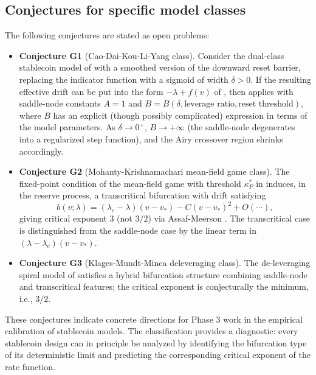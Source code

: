 \documentclass[11pt,a4paper]{article}
\theoremstyle{plain}
\theoremstyle{definition}
\begin{document}
\subsection{Conjectures for specific model classes}

The following conjectures are stated as open problems:

\begin{itemize}
\item \textbf{Conjecture G1} (Cao-Dai-Kou-Li-Yang class). Consider the dual-class stablecoin model of \cite{CaoDaiKouLiYang2025} with a smoothed version of the downward reset barrier, replacing the indicator function with a sigmoid of width $\delta > 0$. If the resulting effective drift can be put into the form $-\lambda + f(v)$ of , then  applies with saddle-node constants $A = 1$ and $B = B(\delta, \text{leverage ratio}, \text{reset threshold})$, where $B$ has an explicit (though possibly complicated) expression in terms of the model parameters. As $\delta \to 0^+$, $B \to +\infty$ (the saddle-node degenerates into a regularized step function), and the Airy crossover region shrinks accordingly.
\item \textbf{Conjecture G2} (Mohanty-Krishnamachari mean-field game class). The fixed-point condition of the mean-field game with threshold $\kappa_P^*$ in \cite{MohantyKrishnamachari2026} induces, in the reserve process, a transcritical bifurcation with drift satisfying
$$b(v;\lambda) = (\lambda_c-\lambda)(v - v_*) - C(v - v_*)^2 + O(\cdots),$$
giving critical exponent $3$ (not $3/2$) via Assaf-Meerson \cite{AssafMeerson2010}. The transcritical case is distinguished from the saddle-node case by the linear term in $(\lambda - \lambda_c)(v - v_*)$.
\item \textbf{Conjecture G3} (Klages-Mundt-Minca deleveraging class). The de-leveraging spiral model of \cite{KlagesMundtMinca2022} satisfies a hybrid bifurcation structure combining saddle-node and transcritical features; the critical exponent is conjecturally the minimum, i.e., $3/2$.
\end{itemize}

These conjectures indicate concrete directions for Phase 3 work in the empirical calibration of stablecoin models. The classification provides a diagnostic: every stablecoin design can in principle be analyzed by identifying the bifurcation type of its deterministic limit and predicting the corresponding critical exponent of the rate function.
\end{document}
